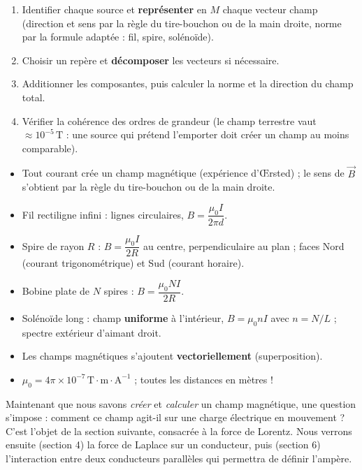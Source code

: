 \documentclass[11pt]{article}
\begin{document}
\begin{methode}
\begin{enumerate}
\item Identifier chaque source et \textbf{représenter} en $M$ chaque vecteur champ (direction et sens par la règle du tire-bouchon ou de la main droite, norme par la formule adaptée : fil, spire, solénoïde).
\item Choisir un repère et \textbf{décomposer} les vecteurs si nécessaire.
\item Additionner les composantes, puis calculer la norme et la direction du champ total.
\item Vérifier la cohérence des ordres de grandeur (le champ terrestre vaut $\approx 10^{-5}\,\text{T}$ : une source qui prétend l'emporter doit créer un champ au moins comparable).
\end{enumerate}
\end{methode}

\begin{aretenir}
\begin{itemize}
\item Tout courant crée un champ magnétique (expérience d'Œrsted) ; le sens de $\vec{B}$ s'obtient par la règle du tire-bouchon ou de la main droite.
\item Fil rectiligne infini : lignes circulaires, $B = \dfrac{\mu_0 I}{2\pi d}$.
\item Spire de rayon $R$ : $B = \dfrac{\mu_0 I}{2R}$ au centre, perpendiculaire au plan ; faces Nord (courant trigonométrique) et Sud (courant horaire).
\item Bobine plate de $N$ spires : $B = \dfrac{\mu_0 N I}{2R}$.
\item Solénoïde long : champ \textbf{uniforme} à l'intérieur, $B = \mu_0 n I$ avec $n = N/L$ ; spectre extérieur d'aimant droit.
\item Les champs magnétiques s'ajoutent \textbf{vectoriellement} (superposition).
\item $\mu_0 = 4\pi \times 10^{-7}\,\text{T}\cdot\text{m}\cdot\text{A}^{-1}$ ; toutes les distances en mètres !
\end{itemize}
\end{aretenir}

Maintenant que nous savons \emph{créer} et \emph{calculer} un champ magnétique, une question s'impose : comment ce champ agit-il sur une charge électrique en mouvement ? C'est l'objet de la section suivante, consacrée à la force de Lorentz. Nous verrons ensuite (section 4) la force de Laplace sur un conducteur, puis (section 6) l'interaction entre deux conducteurs parallèles qui permettra de définir l'ampère.
\end{document}
